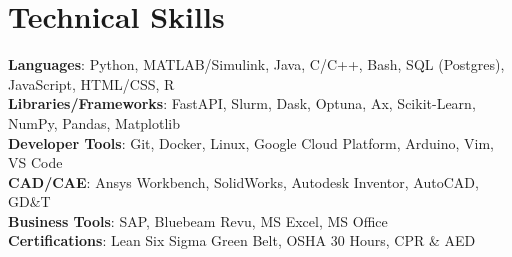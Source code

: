 \documentclass[letterpaper,11pt]{article}
\begin{document}
\section{Technical Skills}
 \begin{itemize}[leftmargin=0.15in, label={}]
    \small{\item{
     \textbf{Languages}{: Python, MATLAB/Simulink, Java, C/C++, Bash, SQL (Postgres), JavaScript, HTML/CSS, R} \\
     \textbf{Libraries/Frameworks}{: FastAPI, Slurm, Dask, Optuna, Ax, Scikit-Learn, NumPy, Pandas, Matplotlib} \\
     \textbf{Developer Tools}{: Git, Docker, Linux, Google Cloud Platform, Arduino, Vim, VS Code} \\
     \textbf{CAD/CAE}{: Ansys Workbench, SolidWorks, Autodesk Inventor, AutoCAD, GD\&T} \\
     \textbf{Business Tools}{: SAP, Bluebeam Revu, MS Excel, MS Office} \\
     \textbf{Certifications}{: Lean Six Sigma Green Belt, OSHA 30 Hours, CPR \& AED} \\
    }}
 \end{itemize}


\end{document}
